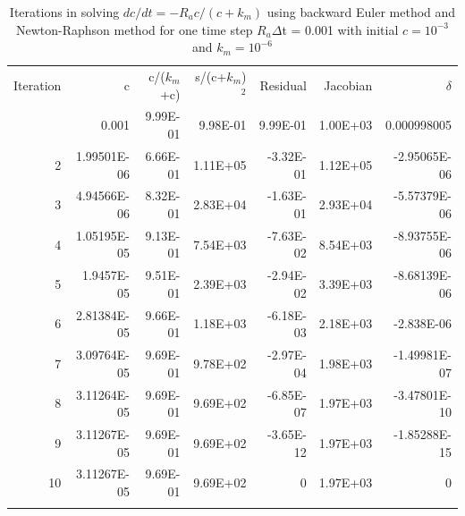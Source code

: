 \documentclass[gmd, manuscript]{copernicus}
\begin{document}
%


\clearpage

\begin{table}[t]
\caption{Iterations in solving $dc/dt=-R_ac/(c+k_m)$ using backward Euler method
and Newton-Raphson method for one time step $R_a\Delta$t = 0.001 with
initial $c=10^{-3}$ and $k_m=10^{-6}$}
\label{table1}
\begin{tabular}{rrrrrrr}
\tophline
Iteration& c &	c/($k_m$+c)& s/(c+$k_m$)$^2$ & Residual	& Jacobian & $\delta$ \\
\middlehline
1 & 0.001	& 9.99E-01 & 9.98E-01 &	9.99E-01 &	1.00E+03 &  0.000998005 \\
2 & 1.99501E-06	& 6.66E-01 & 1.11E+05 &	-3.32E-01& 1.12E+05 &	-2.95065E-06 \\
3 & 4.94566E-06	& 8.32E-01 & 2.83E+04 &	-1.63E-01& 2.93E+04 &	-5.57379E-06 \\
4 & 1.05195E-05	& 9.13E-01 & 7.54E+03 &	-7.63E-02& 8.54E+03 &	-8.93755E-06 \\
5 & 1.9457E-05	& 9.51E-01 & 2.39E+03 &	-2.94E-02& 3.39E+03 &	-8.68139E-06 \\
6 & 2.81384E-05	& 9.66E-01 & 1.18E+03 &	-6.18E-03& 2.18E+03 &	-2.838E-06 \\
7 & 3.09764E-05	& 9.69E-01 & 9.78E+02 &	-2.97E-04& 1.98E+03 &	-1.49981E-07 \\
8 & 3.11264E-05	& 9.69E-01 & 9.69E+02 &	-6.85E-07& 1.97E+03 &	-3.47801E-10 \\
9 & 3.11267E-05	& 9.69E-01 & 9.69E+02 &	-3.65E-12& 1.97E+03 &	-1.85288E-15 \\
10 & 3.11267E-05 & 9.69E-01 & 9.69E+02 & 0 &	1.97E+03 &  0 \\
\bottomhline
\end{tabular}
\end{table}
\end{document}
